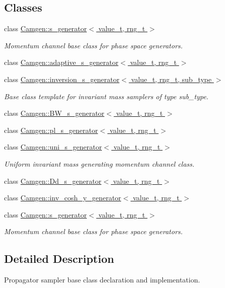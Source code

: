 \subsection*{Classes}
\begin{DoxyCompactItemize}
\item 
class \hyperlink{a00482}{Camgen\-::s\-\_\-generator$<$ value\-\_\-t, rng\-\_\-t $>$}
\begin{DoxyCompactList}\small\item\em Momentum channel base class for phase space generators. \end{DoxyCompactList}\item 
class \hyperlink{a00001}{Camgen\-::adaptive\-\_\-s\-\_\-generator$<$ value\-\_\-t, rng\-\_\-t $>$}
\item 
class \hyperlink{a00317}{Camgen\-::inversion\-\_\-s\-\_\-generator$<$ value\-\_\-t, rng\-\_\-t, sub\-\_\-type $>$}
\begin{DoxyCompactList}\small\item\em Base class template for invariant mass samplers of type sub\-\_\-type. \end{DoxyCompactList}\item 
class \hyperlink{a00033}{Camgen\-::\-B\-W\-\_\-s\-\_\-generator$<$ value\-\_\-t, rng\-\_\-t $>$}
\item 
class \hyperlink{a00420}{Camgen\-::pl\-\_\-s\-\_\-generator$<$ value\-\_\-t, rng\-\_\-t $>$}
\item 
class \hyperlink{a00542}{Camgen\-::uni\-\_\-s\-\_\-generator$<$ value\-\_\-t, rng\-\_\-t $>$}
\begin{DoxyCompactList}\small\item\em Uniform invariant mass generating momentum channel class. \end{DoxyCompactList}\item 
class \hyperlink{a00125}{Camgen\-::\-Dd\-\_\-s\-\_\-generator$<$ value\-\_\-t, rng\-\_\-t $>$}
\item 
class \hyperlink{a00316}{Camgen\-::inv\-\_\-cosh\-\_\-y\-\_\-generator$<$ value\-\_\-t, rng\-\_\-t $>$}
\item 
class \hyperlink{a00482}{Camgen\-::s\-\_\-generator$<$ value\-\_\-t, rng\-\_\-t $>$}
\begin{DoxyCompactList}\small\item\em Momentum channel base class for phase space generators. \end{DoxyCompactList}\end{DoxyCompactItemize}


\subsection{Detailed Description}
Propagator sampler base class declaration and implementation. 